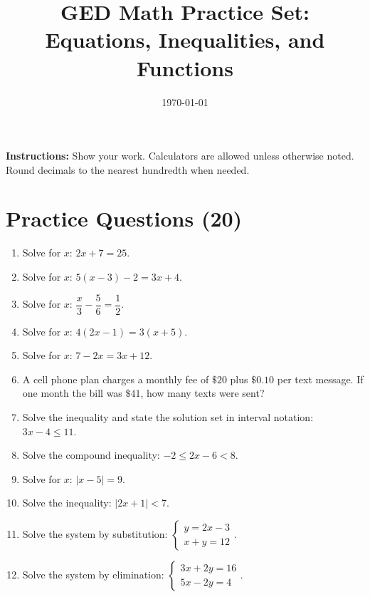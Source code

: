 \documentclass[11pt]{article}
\title{GED Math Practice Set: Equations, Inequalities, and Functions}
\date{\today}
\begin{document}
\maketitle
\noindent\textbf{Instructions:} Show your work. Calculators are allowed unless otherwise noted. Round decimals to the nearest hundredth when needed.

\section*{Practice Questions (20)}
\begin{enumerate}

\item Solve for $x$: $2x + 7 = 25$.

\item Solve for $x$: $5(x - 3) - 2 = 3x + 4$.

\item Solve for $x$: $\dfrac{x}{3} - \dfrac{5}{6} = \dfrac{1}{2}$.

\item Solve for $x$: $4(2x - 1) = 3(x + 5)$.

\item Solve for $x$: $7 - 2x = 3x + 12$.

\item A cell phone plan charges a monthly fee of $\$20$ plus $\$0.10$ per text message. If one month the bill was $\$41$, how many texts were sent?

\item Solve the inequality and state the solution set in interval notation: $3x - 4 \le 11$.

\item Solve the compound inequality: $-2 \le 2x - 6 < 8$.

\item Solve for $x$: $|x - 5| = 9$.

\item Solve the inequality: $|2x + 1| < 7$.

\item Solve the system by substitution: $\begin{cases} y = 2x - 3 \\ x + y = 12 \end{cases}$.

\item Solve the system by elimination: $\begin{cases} 3x + 2y = 16 \\ 5x - 2y = 4 \end{cases}$.


\end{enumerate}
\end{document}
